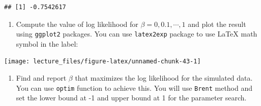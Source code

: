 \documentclass[
]{book}
\newenvironment{Shaded}{\begin{snugshade}}{\end{snugshade}}
\newcommand{\AttributeTok}[1]{\textcolor[rgb]{0.77,0.63,0.00}{#1}}
\newcommand{\DecValTok}[1]{\textcolor[rgb]{0.00,0.00,0.81}{#1}}
\newcommand{\FloatTok}[1]{\textcolor[rgb]{0.00,0.00,0.81}{#1}}
\newcommand{\FunctionTok}[1]{\textcolor[rgb]{0.00,0.00,0.00}{#1}}
\newcommand{\NormalTok}[1]{#1}
\newcommand{\OtherTok}[1]{\textcolor[rgb]{0.56,0.35,0.01}{#1}}
\newcommand{\SpecialCharTok}[1]{\textcolor[rgb]{0.00,0.00,0.00}{#1}}
\newcommand{\StringTok}[1]{\textcolor[rgb]{0.31,0.60,0.02}{#1}}
\providecommand{\tightlist}{%
  \setlength{\itemsep}{0pt}\setlength{\parskip}{0pt}}
\begin{document}
\begin{verbatim}
## [1] -0.7542617
\end{verbatim}

\begin{enumerate}
\def\labelenumi{\arabic{enumi}.}
\tightlist
\item
  Compute the value of log likelihood for \(\beta = 0, 0.1, \cdots, 1\) and plot the result using \texttt{ggplot2} packages. You can use \texttt{latex2exp} package to use LaTeX math symbol in the label:
\end{enumerate}

\begin{Shaded}
\end{Shaded}

\begin{center}\texttt{[image: lecture\_files/figure-latex/unnamed-chunk-43-1]} \end{center}

\begin{enumerate}
\def\labelenumi{\arabic{enumi}.}
\tightlist
\item
  Find and report \(\beta\) that maximizes the log likelihood for the simulated data. You can use \texttt{optim} function to achieve this. You will use \texttt{Brent} method and set the lower bound at -1 and upper bound at 1 for the parameter search.
\end{enumerate}
\end{document}
